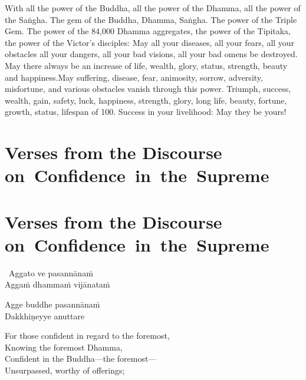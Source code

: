 \begin{english-hang-verses}
  With all the power of the Buddha, all the power of the Dhamma, all the power of the Saṅgha. The gem of the Buddha, Dhamma, Saṅgha. The power of the Triple Gem. The power of the 84,000 Dhamma aggregates, the power of the Tipitaka, the power of the Victor’s disciples: May all your diseases, all your fears, all your obstacles all your dangers, all your bad visions, all your bad omens be destroyed. May there always be an increase of life, wealth, glory, status, strength, beauty and happiness.\ifninebythirteen\clearpage\fi May suffering, disease, fear, animosity, sorrow, adversity, misfortune, and various obstacles vanish through this power. Triumph, success, wealth, gain, safety, luck, happiness, strength, glory, long life, beauty, fortune, growth, status, lifespan of 100. Success in your livelihood: May they be yours!
\end{english-hang-verses}

\suttaRef{[MJG]}

\clearpage



\ifninebythirteen
\section[Verses from the Discourse on Confidence\\ in the Supreme]{Verses from the Discourse \mbox{on}~Confidence~in~the~Supreme}
  \else
\section{Verses from the Discourse \mbox{on}~Confidence~in~the~Supreme}
\fi
\label{confidence-in-supreme}

\begin{pali-hang-together}
  \anglebracketleft\ \hspace{-0.5mm}Aggato ve pasannānaṁ \hspace{-0.5mm}\anglebracketright\ \\
  Aggaṁ dhammaṁ vijānataṁ
\end{pali-hang-together}
\begin{pali-hang-together}
  Agge buddhe pasannānaṁ\\
  Dakkhiṇeyye anuttare
\end{pali-hang-together}

\begin{english-verses}
  For those confident in regard to the foremost,\\
  Knowing the foremost Dhamma,\\
  Confident in the Buddha—the foremost—\\
  Unsurpassed, worthy of offerings;
\end{english-verses}

